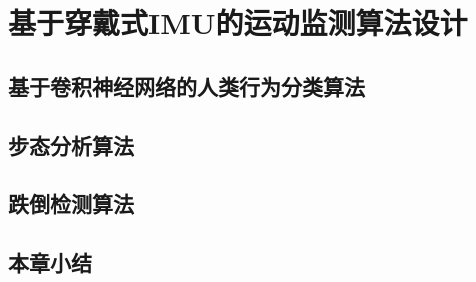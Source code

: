 
\chapter{基于穿戴式IMU的运动监测算法设计}


\section{基于卷积神经网络的人类行为分类算法}


\section{步态分析算法}


\section{跌倒检测算法}


\section{本章小结}
















